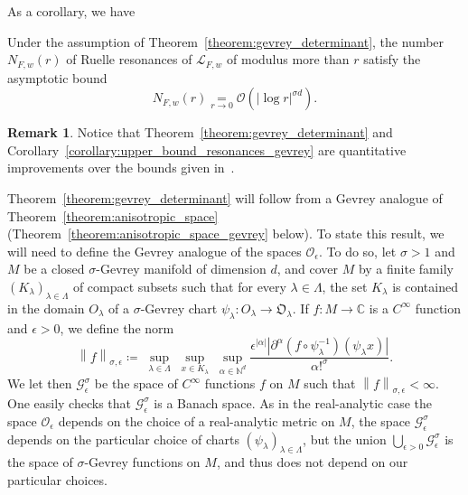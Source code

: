\documentclass[10pt]{amsart}
\theoremstyle{definition}\newtheorem{defi}[theo]{Definition}\newtheorem{rema}[theo]{Remark}\newtheorem{exam}[theo]{Example}\newtheorem{exem}[theo]{Example}\newtheorem{nota}[theo]{Notation}
\newcommand{\p}[1]{\left(#1\right)}
\newcommand{\n}[1]{\left\|#1\right\|}
\newcommand{\va}[1]{\left|#1\right|}
\newcommand{\clO}{\mathcal{O}}
\newcommand{\clL}{\mathcal{L}}
\newcommand{\clG}{\mathcal{G}}
\newcommand{\fkO}{\mathfrak{O}}
\newcommand{\bbC}{\mathbb{C}}
\newcommand{\bbN}{\mathbb{N}}
\begin{document}
As a corollary, we have

\begin{coro}\label{corollary:upper_bound_resonances_gevrey}
Under the assumption of Theorem~\ref{theorem:gevrey_determinant}, the number $N_{F,w}(r)$ of Ruelle resonances of $\clL_{F,w}$ of modulus more than $r$ satisfy the asymptotic bound
\begin{equation*}
N_{F,w}(r) \underset{r \to 0}{=} \clO\p{\va{\log r}^{\sigma d}}.
\end{equation*}
\end{coro}

\begin{rema}
Notice that Theorem~\ref{theorem:gevrey_determinant} and Corollary~\ref{corollary:upper_bound_resonances_gevrey} are quantitative improvements over the bounds given in~\cite[Theorem~2.12]{local_and_global}.
\end{rema}

Theorem~\ref{theorem:gevrey_determinant} will follow from a Gevrey analogue of Theorem~\ref{theorem:anisotropic_space} (Theorem~\ref{theorem:anisotropic_space_gevrey} below). To state this result, we will need to define the Gevrey analogue of the spaces $\clO_\epsilon$. To do so, let $\sigma > 1$ and $M$ be a closed $\sigma$-Gevrey manifold of dimension $d$, and cover $M$ by a finite family $(K_\lambda)_{\lambda \in \Lambda}$ of compact subsets such that for every $\lambda \in \Lambda$, the set $K_\lambda$ is contained in the domain $O_\lambda$ of a $\sigma$-Gevrey chart $\psi_\lambda : O_\lambda \to \fkO_\lambda$. If $f : M \to \bbC$ is a $C^\infty$ function and $\epsilon > 0$, we define the norm
\begin{equation*}
\n{f}_{\sigma,\epsilon} \coloneqq\; \sup_{\lambda  \in \Lambda}\; \sup_{x \in K_\lambda}\; \sup_{\alpha \in \bbN^d} \frac{\epsilon^{\va{\alpha}}\va{\partial^\alpha \left(f \circ \psi_\lambda^{-1}\right)(\psi_\lambda x)}}{\alpha!^\sigma}.
\end{equation*}
We let then $\clG^\sigma_\epsilon$ be the space of $C^\infty$ functions $f$ on $M$ such that $\n{f}_{\sigma,\epsilon} < \infty$. One easily checks that $\clG^\sigma_\epsilon$ is a Banach space. As in the real-analytic case the space $\clO_\epsilon$ depends on the choice of a real-analytic metric on $M$, the space $\clG^\sigma_\epsilon$ depends on the particular choice of charts $(\psi_\lambda)_{\lambda \in \Lambda}$, but the union $\bigcup_{\epsilon > 0} \clG^\sigma_\epsilon$ is the space of $\sigma$-Gevrey functions on $M$, and thus does not depend on our particular choices.
\end{document}
